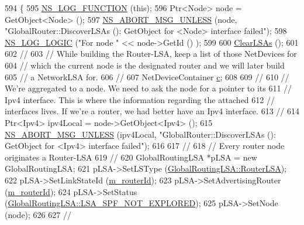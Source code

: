 \begin{DoxyCode}
594 \{
595   \hyperlink{log-macros-disabled_8h_a90b90d5bad1f39cb1b64923ea94c0761}{NS\_LOG\_FUNCTION} (\textcolor{keyword}{this});
596   Ptr<Node> node = GetObject<Node> ();
597   \hyperlink{group__fatal_ga0bd3f62c55e7347ff814572f3aaa3864}{NS\_ABORT\_MSG\_UNLESS} (node, \textcolor{stringliteral}{"GlobalRouter::DiscoverLSAs (): GetObject for <Node>
       interface failed"});
598   \hyperlink{group__logging_ga88acd260151caf2db9c0fc84997f45ce}{NS\_LOG\_LOGIC} (\textcolor{stringliteral}{"For node "} << node->GetId () );
599 
600   \hyperlink{classns3_1_1GlobalRouter_a7c6430b2da06fff5ce1fda4ac90c4836}{ClearLSAs} ();
601 
602   \textcolor{comment}{//}
603   \textcolor{comment}{// While building the Router-LSA, keep a list of those NetDevices for}
604   \textcolor{comment}{// which the current node is the designated router and we will later build }
605   \textcolor{comment}{// a NetworkLSA for.}
606   \textcolor{comment}{//}
607   NetDeviceContainer \hyperlink{lte_2model_2fading-traces_2fading__trace__generator_8m_ae0323a9039add2978bf5b49550572c7c}{c};
608 
609   \textcolor{comment}{//}
610   \textcolor{comment}{// We're aggregated to a node.  We need to ask the node for a pointer to its}
611   \textcolor{comment}{// Ipv4 interface.  This is where the information regarding the attached }
612   \textcolor{comment}{// interfaces lives.  If we're a router, we had better have an Ipv4 interface.}
613   \textcolor{comment}{//}
614   Ptr<Ipv4> ipv4Local = node->GetObject<Ipv4> ();
615   \hyperlink{group__fatal_ga0bd3f62c55e7347ff814572f3aaa3864}{NS\_ABORT\_MSG\_UNLESS} (ipv4Local, \textcolor{stringliteral}{"GlobalRouter::DiscoverLSAs (): GetObject for <Ipv4>
       interface failed"});
616 
617   \textcolor{comment}{//}
618   \textcolor{comment}{// Every router node originates a Router-LSA}
619   \textcolor{comment}{//}
620   GlobalRoutingLSA *pLSA = \textcolor{keyword}{new} GlobalRoutingLSA;
621   pLSA->SetLSType (\hyperlink{classns3_1_1GlobalRoutingLSA_a34eb53a1ed37c877923b74d671224fdeada9e6185a392b3bb450846f5282e415d}{GlobalRoutingLSA::RouterLSA});
622   pLSA->SetLinkStateId (\hyperlink{classns3_1_1GlobalRouter_aa107123583f6b2b68c61666a029b4270}{m\_routerId});
623   pLSA->SetAdvertisingRouter (\hyperlink{classns3_1_1GlobalRouter_aa107123583f6b2b68c61666a029b4270}{m\_routerId});
624   pLSA->SetStatus (\hyperlink{classns3_1_1GlobalRoutingLSA_a18bf63da580856fe1cc158aa855af1bda0d9a91161488cead75d479293fd05a94}{GlobalRoutingLSA::LSA\_SPF\_NOT\_EXPLORED});
625   pLSA->SetNode (node);
626 
627   \textcolor{comment}{//}

\end{DoxyCode}
